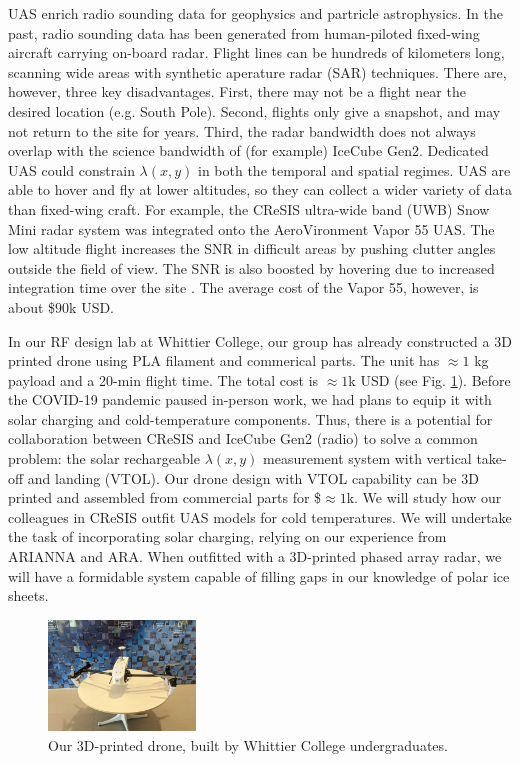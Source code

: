 \documentclass[10pt]{amsart}
\theoremstyle{definition}
\numberwithin{equation}{section}
\begin{document}
UAS enrich radio sounding data for geophysics and partricle astrophysics.  In the past, radio sounding data has been generated from human-piloted fixed-wing aircraft carrying on-board radar.  Flight lines can be hundreds of kilometers long, scanning wide areas with synthetic aperature radar (SAR) techniques.  There are, however, three key disadvantages.  First, there may not be a flight near the desired location (e.g. South Pole).  Second, flights only give a snapshot, and may not return to the site for years.  Third, the radar bandwidth does not always overlap with the science bandwidth of (for example) IceCube Gen2.  Dedicated UAS could constrain $\lambda(x,y)$ in both the temporal and spatial regimes.  UAS are able to hover and fly at lower altitudes, so they can collect a wider variety of data than fixed-wing craft.  For example, the CReSIS ultra-wide band (UWB) Snow Mini radar system was integrated onto the AeroVironment Vapor 55 UAS.  The low altitude flight increases the SNR in difficult areas by pushing clutter angles outside the field of view.  The SNR is also boosted by hovering due to increased integration time over the site \cite{arnold_2020}. The average cost of the Vapor 55, however, is about \$$90$k USD.  

In our RF design lab at Whittier College, our group has already constructed a 3D printed drone using PLA filament and commerical parts.  The unit has $\approx 1$ kg payload and a 20-min flight time.  The total cost is $\approx 1$k USD (see Fig. \ref{fig:drone}).  Before the COVID-19 pandemic paused in-person work, we had plans to equip it with solar charging and cold-temperature components.  Thus, there is a potential for collaboration between CReSIS and IceCube Gen2 (radio) to solve a common problem: the solar rechargeable $\lambda(x,y)$ measurement system with vertical take-off and landing (VTOL).  Our drone design with VTOL capability can be 3D printed and assembled from commercial parts for \$$\approx1$k.  We will study how our colleagues in CReSIS outfit UAS models for cold temperatures.  We will undertake the task of incorporating solar charging, relying on our experience from ARIANNA and ARA.  When outfitted with a 3D-printed phased array radar, we will have a formidable system capable of filling gaps in our knowledge of polar ice sheets.  

\begin{figure}
\centering
\includegraphics[width=0.35\textwidth]{drone.jpg}
\caption{\label{fig:drone} Our 3D-printed drone, built by Whittier College undergraduates.}
\end{figure}
\end{document}
